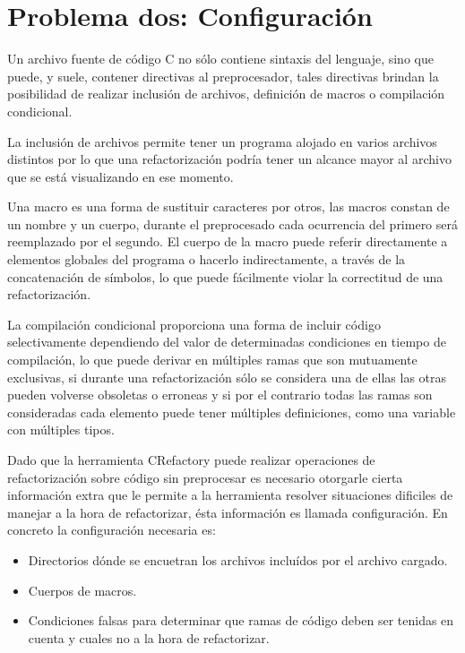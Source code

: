 \documentclass[a4paper,oneside,12pt]{article}
\begin{document}
\section{Problema dos: Configuraci\'on}

Un archivo fuente de c\'odigo C no s\'olo contiene sintaxis del lenguaje, sino que puede, y suele, contener directivas al preprocesador, tales directivas brindan la posibilidad de realizar inclusi\'on de archivos, definici\'on de macros o compilaci\'on condicional.

La inclusi\'on de archivos permite tener un programa alojado en varios archivos distintos por lo que una refactorizaci\'on podr\'ia tener un alcance mayor al archivo que se est\'a visualizando en ese momento.

Una macro es una forma de sustituir caracteres por otros, las macros constan de un nombre y un cuerpo, durante el preprocesado cada ocurrencia del primero ser\'a reemplazado por el segundo. El cuerpo de la macro puede referir directamente a elementos globales del programa o hacerlo indirectamente, a trav\'es de la concatenaci\'on de s\'imbolos, lo que puede f\'acilmente violar la correctitud de una refactorizaci\'on.

La compilaci\'on condicional proporciona una forma de incluir c\'odigo selectivamente dependiendo del valor de determinadas condiciones en tiempo de compilaci\'on, lo que puede derivar en m\'ultiples ramas que son mutuamente exclusivas, si durante una refactorizaci\'on s\'olo se considera una de ellas las otras pueden volverse obsoletas o erroneas y si por el contrario todas las ramas son consideradas cada elemento puede tener m\'ultiples definiciones, como una variable con m\'ultiples tipos.

Dado que la herramienta CRefactory puede realizar operaciones de refactorizaci\'on sobre c\'odigo sin preprocesar es necesario otorgarle cierta informaci\'on extra que le permite a la herramienta resolver situaciones dificiles de manejar a la hora de refactorizar, \'esta informaci\'on es llamada configuraci\'on. En concreto la configuraci\'on necesaria es:

\begin{itemize}
\item Directorios d\'onde se encuetran los archivos inclu\'idos por el archivo cargado.
\item Cuerpos de macros.
\item Condiciones falsas para determinar que ramas de c\'odigo deben ser tenidas en cuenta y cuales no a la hora de refactorizar.
\end{itemize}
\end{document}
